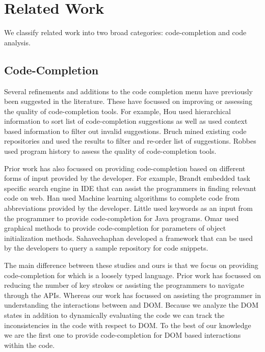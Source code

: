 \section{Related Work}
\label{Sec:Related}
We classify related work into two broad categories: code-completion and \javascript code analysis.

	\subsection{Code-Completion}
	\label{Sec:Related1}
	Several refinements and additions to the code completion menu have previously been suggested in the literature. These have focussed on improving or assessing the quality of code-completion tools. For example, Hou \etal \cite{hou2011evaluation} used hierarchical information to sort list of code-completion suggestions as well as used context based information to filter out invalid suggestions. Bruch \etal \cite{bruch2009learning} mined existing code repositories and used the results to filter and re-order list of suggestions. Robbes \etal \cite{robbes2008program} used program history to assess the quality of code-completion tools. 
	
	Prior work has also focussed on providing code-completion based on different forms of input provided by the developer. For example, Brandt \etal \cite{brandt2010example} embedded task specific search engine in IDE that can assist the programmers in finding relevant code on web. Han \etal \cite{han2009code} used Machine learning algorithms to complete code from abbreviations provided by the developer. Little \etal \cite{little2009keyword} used keywords as an input from the programmer to provide code-completion for Java programs. Omar \etal \cite{omar2012active} used graphical methods to provide code-completion for parameters of object initialization methods. Sahavechaphan \etal \cite{sahavechaphan2006xsnippet} developed a framework that can be used by the developers to query a sample repository for code snippets.

	The main difference between these studies and ours is that we focus on providing code-completion for \javascript which is a  loosely typed language. Prior work has focussed on reducing the number of key strokes or assisting the programmers to navigate through the APIs. Whereas our work has focussed on assisting the programmer in understanding the interactions between \javascript and DOM. Because we analyze the DOM states in addition to dynamically evaluating the \javascript code we can track the inconsistencies in the \javascript code with respect to DOM. To the best of our knowledge we are the first one to provide code-completion for DOM based interactions within the \javascript code.

